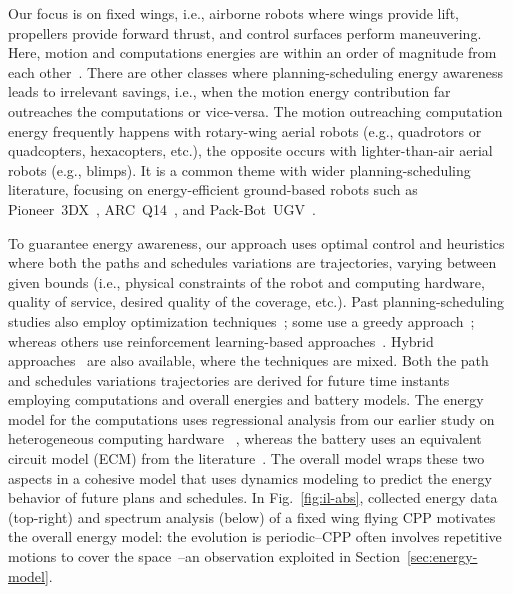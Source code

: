 \documentclass[letterpaper,10pt,journal,twoside]{IEEEtran}
\theoremstyle{definition}
\newtheorem*{ctb}{Contribution}
\begin{document}
Our focus is on fixed wings, i.e., airborne robots where wings provide lift, propellers provide forward thrust, and control surfaces perform maneuvering. Here, motion and computations energies are within an order of magnitude from each other~\cite{seewald2020mechanical}. %
{\color{blue}T}here are other classes where planning-scheduling energy awareness leads to irrelevant savings, i.e., when the motion energy contribution far outreaches the computations or vice-versa. The {\color{blue}motion outreaching computation energy} frequently happens with rotary-wing aerial robots (e.g., quadrotors or quadcopters, hexacopters, etc.){\color{blue}, the opposite occurs with} lighter-than-air aerial robots (e.g., blimps). It is a common theme with wider planning-scheduling literature, focusing on energy-efficient ground-based robots such as Pioneer~3DX~\cite{ho2019qos,mei2005case}, ARC~Q14~\cite{ondruska2015scheduled,lahijanian2018resource}, and Pack-Bot~UGV~\cite{sadrpour2013mission}.

To guarantee energy awareness, our approach uses optimal control {\color{blue} and heuristics} where both the paths and schedules variations are trajectories, varying between given bounds (i.e., physical constraints of the robot and computing hardware, quality of service, desired quality of the coverage, etc.). Past planning-scheduling studies also employ optimization techniques~\cite{brateman2006energy,zhang2007low,ondruska2015scheduled,lahijanian2018resource}; some use a greedy approach~\cite{mei2005case,sudhakar2020balancing,sadrpour2013mission}; whereas others use reinforcement learning-based approaches~\cite{ho2019qos,ho2018towards}. {\color{blue}Hybrid approaches~\cite{ondruska2015scheduled} are also available, where the techniques are mixed.} Both the path and schedules variations trajectories are derived for future time instants employing computations and overall energies and battery models. The energy model for the computations uses regressional analysis from our earlier study on heterogeneous computing hardware%
~\cite{seewald2019coarse,seewald2019component}, whereas the battery uses an equivalent circuit model (ECM) from the literature~\cite{%
hinz2019comparison,mousavi2014various}. The overall model wraps these two aspects in a cohesive model that uses dynamics modeling to predict the energy behavior of future plans and schedules. In Fig.~\ref{fig:il-abs}, collected energy data ({\color{blue}top-right}) and spectrum analysis ({\color{blue}below}) of a fixed wing %
flying CPP motivates the overall energy model: the evolution is periodic--CPP often involves repetitive motions to cover the space~\cite{choset2001coverage,galceran2013survey}--an observation exploited in Section~\ref{sec:energy-model}.%
\end{document}
